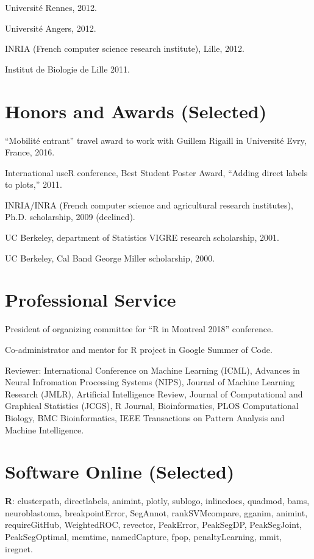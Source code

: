 \documentclass[margin,line]{res}
\begin{document}
\begin{resume}
Universit\'e Rennes, 2012.

Universit\'e Angers, 2012.

INRIA (French computer science research institute), Lille, 2012.

Institut de Biologie de Lille 2011.

\section{\sc Honors and Awards (Selected)}

``Mobilit\'e entrant'' travel award to work with Guillem Rigaill in
Universit\'e Evry, France, 2016.

International useR conference, Best Student Poster Award, ``Adding
direct labels to plots,'' 2011.

INRIA/INRA (French computer science and agricultural research institutes), Ph.D. scholarship, 2009 (declined).

UC Berkeley, department of Statistics VIGRE research scholarship, 2001.

UC Berkeley, Cal Band George Miller scholarship, 2000.

\section{\sc Professional Service}

President of organizing committee for ``R in Montreal 2018'' conference.

Co-administrator and mentor for R project in Google Summer of Code.

Reviewer: International Conference on Machine Learning (ICML),
Advances in Neural Infromation Processing Systems (NIPS), Journal of
Machine Learning Research (JMLR), Artificial Intelligence Review,
Journal of Computational and Graphical Statistics (JCGS), R Journal,
Bioinformatics, PLOS Computational Biology, BMC Bioinformatics, IEEE
Transactions on Pattern Analysis and Machine Intelligence.

\section{\sc Software Online (Selected)} 

{\bf R}: clusterpath, directlabels, animint, plotly, sublogo,
inlinedocs, quadmod, bams, neuroblastoma, breakpointError, SegAnnot,
rankSVMcompare, gganim, animint, requireGitHub, WeightedROC, revector,
PeakError, PeakSegDP, PeakSegJoint, PeakSegOptimal, memtime,
namedCapture, fpop, \mbox{penaltyLearning}, mmit, iregnet.


\end{resume}
\end{document}
